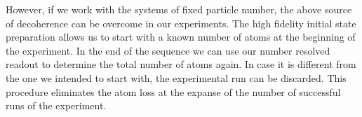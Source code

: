 However, if we work with the systems of fixed particle number, the above source of decoherence can be overcome in our experiments. The high fidelity initial state preparation allows us to start with a known number of atoms at the beginning of the experiment. In the end of the sequence we can use our number resolved readout to determine the total number of atoms again. In case it is different from the one we intended to start with, the experimental run can be discarded. This procedure eliminates the atom loss at the expanse of the number of successful runs of the experiment.  